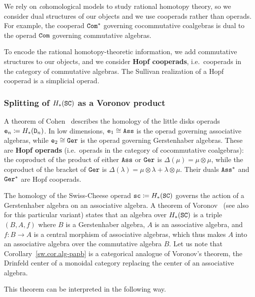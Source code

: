 We rely on \emph{co}homological models to study rational homotopy theory, so we consider dual structures of our objects and we use cooperads rather than operads.
For example, the cooperad $\mathtt{Com}^{*}$ governing cocommutative coalgebras is dual to the operad $\mathtt{Com}$ governing commutative algebras.

To encode the rational homotopy-theoretic information, we add commutative structures to our objects, and we consider \textbf{Hopf cooperads}, i.e.\ cooperads in the category of commutative algebras.
The Sullivan realization of a Hopf cooperad is a simplicial operad.

\subsubsection{Splitting of $H_{*}(\mathtt{SC})$ as a Voronov product}
\label{sw.sec.homology-dd_n-sc}

A theorem of Cohen~\cite{Cohen1976} describes the homology of the little disks operads $\mathtt{e}_{n} \coloneqq H_{*}(\mathtt{D}_{n})$.
In low dimensions, $\mathtt{e}_{1} \cong \mathtt{Ass}$ is the operad governing associative algebras, while $\mathtt{e}_{2} \cong \mathtt{Ger}$ is the operad governing Gerstenhaber algebras.
These are \textbf{Hopf operads} (i.e.\ operads in the category of cocommutative coalgebras): the coproduct of the product of either $\mathtt{Ass}$ or $\mathtt{Ger}$ is $\Delta(\mu) = \mu \otimes \mu$, while the coproduct of the bracket of $\mathtt{Ger}$ is $\Delta(\lambda) = \mu \otimes \lambda + \lambda \otimes \mu$.
Their duals $\mathtt{Ass}^{*}$ and $\mathtt{Ger}^{*}$ are Hopf cooperads.

The homology of the Swiss-Cheese operad $\mathtt{sc} \coloneqq H_{*}(\mathtt{SC})$ governs the action of a Gerstenhaber algebra on an associative algebra.
A theorem of Voronov~\cite[Theorem 3.3]{Voronov1999} (see also~\cite[Theorem 6.1.1]{HoefelLivernet2012} for this particular variant) states that an algebra over $H_{*}(\mathtt{SC})$ is a triple $(B,A,f)$ where $B$ is a Gerstenhaber algebra, $A$ is an associative algebra, and $f : B \to A$ is a central morphism of associative algebras, which thus makes $A$ into an associative algebra over the commutative algebra $B$.
Let us note that Corollary~\ref{sw.cor.alg-papb} is a categorical analogue of Voronov's theorem, the Drinfeld center of a monoidal category replacing the center of an associative algebra.

This theorem can be interpreted in the following way.

